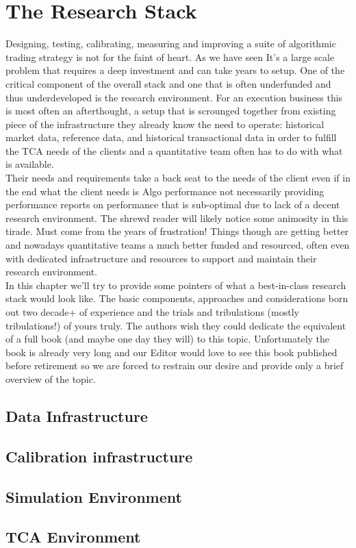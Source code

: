 
\chapter{The Research Stack}
Designing, testing, calibrating, measuring and improving a suite of algorithmic trading strategy is not for the faint of heart. As we have  seen It's a large scale problem that requires a deep investment and can take years to setup. One of the critical component of the overall stack and one that is often underfunded and thus underdeveloped is the research environment. For an execution business this is most often an afterthought, a setup that is scrounged together from existing piece of the infrastructure they already know the need to operate: historical market data, reference data, and historical transactional data in order to fulfill the TCA needs of the clients and a quantitative team often has to do with what is available. \\

Their needs and requirements take a back seat to the needs of the client even if in the end what the client needs is Algo performance not necessarily providing performance reports on  performance that is sub-optimal due to lack of a decent research environment. The shrewd reader will likely notice some animosity in this tirade. Must come from the years of frustration! Things though are getting better and nowadays quantitative teams a much better funded and resourced, often even with dedicated infrastructure and resources to support and maintain their research environment.\\

In this chapter we'll try to provide some pointers of what a best-in-class research stack would look like. The basic components, approaches and considerations born out two decade+  of experience and the trials and tribulations (mostly tribulations!) of yours truly. The authors wish they could dedicate the equivalent of a full book (and maybe one day they will) to this topic. Unfortunately the book is already very long and our Editor would love to see this book published before retirement so we are forced to restrain our desire and provide only a brief overview of the topic. 
 
\section{Data Infrastructure}
\section{Calibration infrastructure}
\section{Simulation Environment}
\section{TCA Environment}

